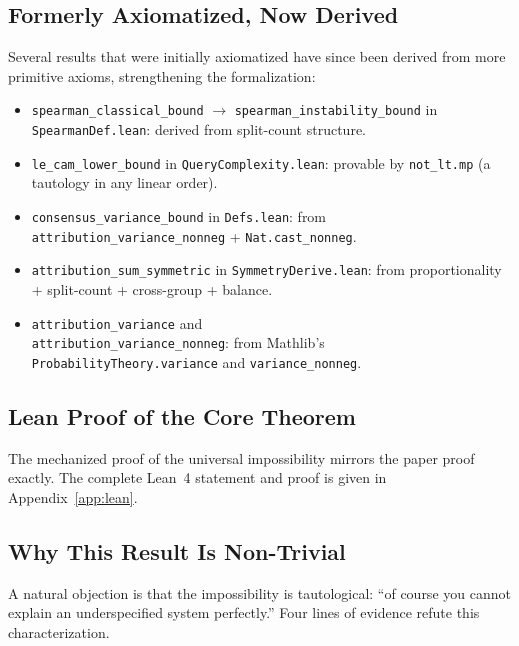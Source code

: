 \documentclass[11pt,a4paper]{article}
\begin{document}
\subsection{Formerly Axiomatized, Now Derived}

Several results that were initially axiomatized have since been derived from
more primitive axioms, strengthening the formalization:

\begin{itemize}
  \item \texttt{spearman\_classical\_bound} $\to$
    \texttt{spearman\_instability\_bound} in \texttt{SpearmanDef.lean}:
    derived from split-count structure.
  \item \texttt{le\_cam\_lower\_bound} in \texttt{QueryComplexity.lean}:
    provable by \texttt{not\_lt.mp} (a tautology in any linear order).
  \item \texttt{consensus\_variance\_bound} in
    \texttt{Defs.lean}: from\\
    \texttt{attribution\_variance\_nonneg} +
    \texttt{Nat.cast\_nonneg}.
  \item \texttt{attribution\_sum\_symmetric} in
    \texttt{SymmetryDerive.lean}: from proportionality +
    split-count + cross-group + balance.
  \item \texttt{attribution\_variance} and\\
    \texttt{attribution\_variance\_nonneg}: from Mathlib's\\
    \texttt{ProbabilityTheory.variance} and
    \texttt{variance\_nonneg}.
\end{itemize}

\subsection{Lean Proof of the Core Theorem}

The mechanized proof of the universal impossibility mirrors the paper proof
exactly.  The complete Lean~4 statement and proof is given in
Appendix~\ref{app:lean}.

\subsection{Why This Result Is Non-Trivial}
\label{sec:non-trivial}

A natural objection is that the impossibility is tautological: ``of course
you cannot explain an underspecified system perfectly.''  Four lines of
evidence refute this characterization.
\end{document}
